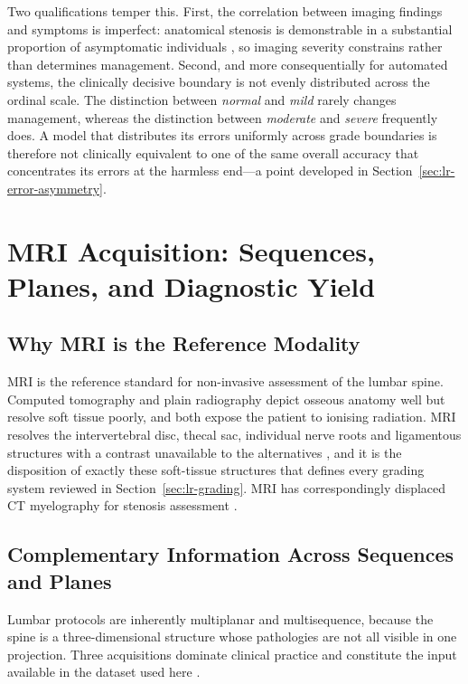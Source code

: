 Two qualifications temper this. First, the correlation between imaging findings
and symptoms is imperfect: anatomical stenosis is demonstrable in a substantial
proportion of asymptomatic individuals \cite{lurie2008reliability,esposito2025mribased},
so imaging severity constrains rather than determines management. Second, and
more consequentially for automated systems, the clinically decisive boundary is
not evenly distributed across the ordinal scale. The distinction between
\emph{normal} and \emph{mild} rarely changes management, whereas the distinction
between \emph{moderate} and \emph{severe} frequently does. A model that
distributes its errors uniformly across grade boundaries is therefore not
clinically equivalent to one of the same overall accuracy that concentrates its
errors at the harmless end---a point developed in
Section~\ref{sec:lr-error-asymmetry}.

\section{MRI Acquisition: Sequences, Planes, and Diagnostic Yield}
\label{sec:lr-mri}

\subsection{Why MRI is the Reference Modality}
\label{sec:lr-why-mri}

MRI is the reference standard for non-invasive assessment of the lumbar spine.
Computed tomography and plain radiography depict osseous anatomy well but
resolve soft tissue poorly, and both expose the patient to ionising radiation.
MRI resolves the intervertebral disc, thecal sac, individual nerve roots and
ligamentous structures with a contrast unavailable to the alternatives
\cite{zhao2025advances,liawrungrueang2025artificial}, and it is the disposition
of exactly these soft-tissue structures that defines every grading system
reviewed in Section~\ref{sec:lr-grading}. MRI has correspondingly displaced CT
myelography for stenosis assessment \cite{tumko2024a}.

\subsection{Complementary Information Across Sequences and Planes}
\label{sec:lr-sequences}

Lumbar protocols are inherently multiplanar and multisequence, because the spine
is a three-dimensional structure whose pathologies are not all visible in one
projection. Three acquisitions dominate clinical practice and constitute the
input available in the dataset used here \cite{richards2026the}.

